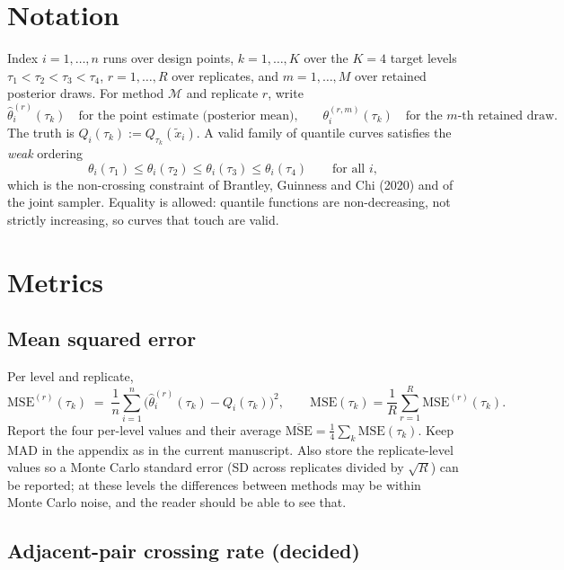 \documentclass[11pt]{article}
\begin{document}
\section{Notation}

Index $i=1,\dots,n$ runs over design points, $k=1,\dots,K$ over the $K=4$ target levels $\tau_1<\tau_2<\tau_3<\tau_4$, $r=1,\dots,R$ over replicates, and $m=1,\dots,M$ over retained posterior draws. For method $\mathcal{M}$ and replicate $r$, write
\[
\hat\theta^{(r)}_{i}(\tau_k)\quad\text{for the point estimate (posterior mean),}\qquad
\theta^{(r,m)}_{i}(\tau_k)\quad\text{for the $m$-th retained draw.}
\]
The truth is $Q_i(\tau_k) := Q_{\tau_k}(\tilde x_i)$. A valid family of quantile curves satisfies the \emph{weak} ordering
\begin{equation}
\theta_i(\tau_1)\le\theta_i(\tau_2)\le\theta_i(\tau_3)\le\theta_i(\tau_4)\qquad\text{for all } i,
\label{eq:order}
\end{equation}
which is the non-crossing constraint of Brantley, Guinness and Chi (2020) and of the joint sampler. Equality is allowed: quantile functions are non-decreasing, not strictly increasing, so curves that touch are valid.

\section{Metrics}

\subsection{Mean squared error}

Per level and replicate,
\[
\mathrm{MSE}^{(r)}(\tau_k) \;=\; \frac1n\sum_{i=1}^n\bigl(\hat\theta^{(r)}_i(\tau_k)-Q_i(\tau_k)\bigr)^2,
\qquad
\mathrm{MSE}(\tau_k)=\frac1R\sum_{r=1}^R \mathrm{MSE}^{(r)}(\tau_k).
\]
Report the four per-level values and their average $\overline{\mathrm{MSE}}=\tfrac14\sum_k\mathrm{MSE}(\tau_k)$. Keep MAD in the appendix as in the current manuscript. Also store the replicate-level values so a Monte Carlo standard error (SD across replicates divided by $\sqrt{R}$) can be reported; at these levels the differences between methods may be within Monte Carlo noise, and the reader should be able to see that.

\subsection{Adjacent-pair crossing rate (decided)}
\label{sec:cr}
\end{document}
